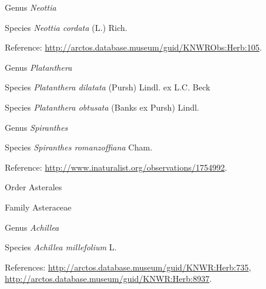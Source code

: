 \documentclass[9pt, article]{memoir}
\begin{document}
\begin{multicols}{2}
\vspace{6pt}\noindent\hspace{30pt}Genus \textit{Neottia}


\vspace{6pt}\noindent\hspace{36pt}Species \textit{Neottia cordata} (L.) Rich.


\vspace{6pt}Reference: 
\url{http://arctos.database.museum/guid/KNWRObs:Herb:105}.

\vspace{6pt}\noindent\hspace{30pt}Genus \textit{Platanthera}


\vspace{6pt}\noindent\hspace{36pt}Species \textit{Platanthera dilatata} (Pursh) Lindl. ex L.C. Beck


\vspace{6pt}\noindent\hspace{36pt}Species \textit{Platanthera obtusata} (Banks ex Pursh) Lindl.


\vspace{6pt}\noindent\hspace{30pt}Genus \textit{Spiranthes}


\vspace{6pt}\noindent\hspace{36pt}Species \textit{Spiranthes romanzoffiana} Cham.


\vspace{6pt}Reference: 
\url{http://www.inaturalist.org/observations/1754992}.

\vspace{6pt}\noindent\hspace{18pt}Order Asterales


\vspace{6pt}\noindent\hspace{24pt}Family Asteraceae


\vspace{6pt}\noindent\hspace{30pt}Genus \textit{Achillea}


\vspace{6pt}\noindent\hspace{36pt}Species \textit{Achillea millefolium} L.


\vspace{6pt}References: 
\url{http://arctos.database.museum/guid/KNWR:Herb:735}, 
\url{http://arctos.database.museum/guid/KNWR:Herb:8937}.


\end{multicols}
\end{document}
